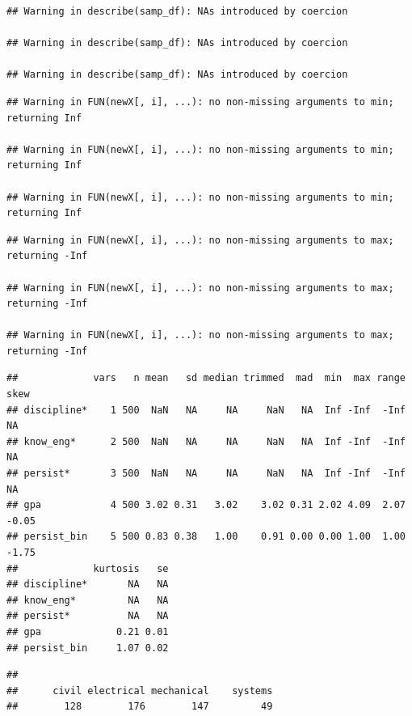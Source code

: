 \documentclass[
]{book}
\newenvironment{Shaded}{\begin{snugshade}}{\end{snugshade}}
\newcommand{\FunctionTok}[1]{\textcolor[rgb]{0.00,0.00,0.00}{#1}}
\newcommand{\NormalTok}[1]{#1}
\newcommand{\SpecialCharTok}[1]{\textcolor[rgb]{0.00,0.00,0.00}{#1}}
\begin{document}
\begin{verbatim}
## Warning in describe(samp_df): NAs introduced by coercion

## Warning in describe(samp_df): NAs introduced by coercion

## Warning in describe(samp_df): NAs introduced by coercion
\end{verbatim}

\begin{verbatim}
## Warning in FUN(newX[, i], ...): no non-missing arguments to min; returning Inf

## Warning in FUN(newX[, i], ...): no non-missing arguments to min; returning Inf

## Warning in FUN(newX[, i], ...): no non-missing arguments to min; returning Inf
\end{verbatim}

\begin{verbatim}
## Warning in FUN(newX[, i], ...): no non-missing arguments to max; returning -Inf

## Warning in FUN(newX[, i], ...): no non-missing arguments to max; returning -Inf

## Warning in FUN(newX[, i], ...): no non-missing arguments to max; returning -Inf
\end{verbatim}

\begin{verbatim}
##             vars   n mean   sd median trimmed  mad  min  max range  skew
## discipline*    1 500  NaN   NA     NA     NaN   NA  Inf -Inf  -Inf    NA
## know_eng*      2 500  NaN   NA     NA     NaN   NA  Inf -Inf  -Inf    NA
## persist*       3 500  NaN   NA     NA     NaN   NA  Inf -Inf  -Inf    NA
## gpa            4 500 3.02 0.31   3.02    3.02 0.31 2.02 4.09  2.07 -0.05
## persist_bin    5 500 0.83 0.38   1.00    0.91 0.00 0.00 1.00  1.00 -1.75
##             kurtosis   se
## discipline*       NA   NA
## know_eng*         NA   NA
## persist*          NA   NA
## gpa             0.21 0.01
## persist_bin     1.07 0.02
\end{verbatim}

\begin{Shaded}
\end{Shaded}

\begin{verbatim}
## 
##      civil electrical mechanical    systems 
##        128        176        147         49
\end{verbatim}
\end{document}
